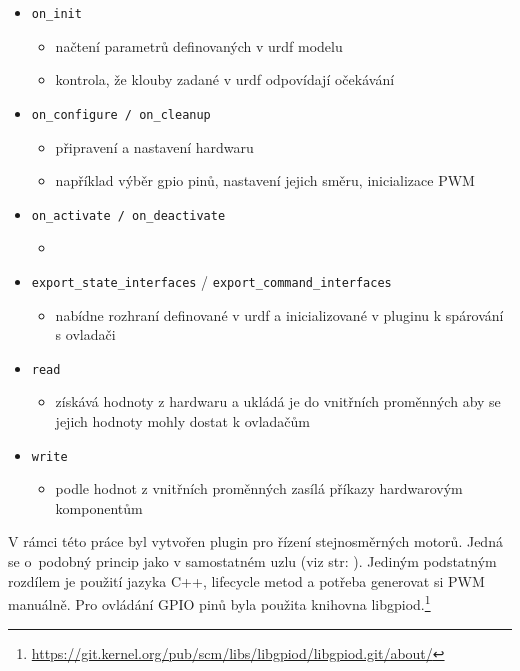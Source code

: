 \newpage
\begin{itemize}[leftmargin=*]
	\item{\verb|on_init|}
	\vspace*{-0.5em}
	\begin{itemize}
		\item{načtení parametrů definovaných v urdf modelu}
		\item{kontrola, že klouby zadané v urdf odpovídají očekávání}
	\end{itemize}
	\item{\verb|on_configure / on_cleanup|}
	\vspace*{-0.5em}
	\begin{itemize}
		\item{připravení a nastavení hardwaru}
		\item{například výběr gpio pinů, nastavení jejich směru, inicializace PWM}
	\end{itemize}
	\item{\verb|on_activate / on_deactivate|}
	\vspace*{-0.5em}
	\begin{itemize}
		\item{}
	\end{itemize}
	\item{\verb|export_state_interfaces| / \verb|export_command_interfaces|}
	\vspace*{-0.5em}
	\begin{itemize}
		\item{nabídne rozhraní definované v urdf a inicializované v pluginu k spárování s ovladači}
	\end{itemize}
	\item{\verb|read|}
	\vspace*{-0.5em}
	\begin{itemize}
		\item{získává hodnoty z hardwaru a ukládá je do vnitřních proměnných aby se jejich hodnoty mohly dostat k ovladačům}
	\end{itemize}
	\item{\verb|write|}
	\vspace*{-0.5em}
	\begin{itemize}
		\item{podle hodnot z vnitřních proměnných zasílá příkazy hardwarovým komponentům}
	\end{itemize}
\end{itemize}

V rámci této práce byl vytvořen plugin pro řízení stejnosměrných motorů. Jedná se o~podobný princip jako v samostatném uzlu (viz str: \pageref{implementation:motors}). Jediným podstatným rozdílem je použití jazyka C++, lifecycle metod a potřeba generovat si PWM manuálně. Pro ovládání GPIO pinů byla použita knihovna libgpiod.\footnote{\url{https://git.kernel.org/pub/scm/libs/libgpiod/libgpiod.git/about/}}

